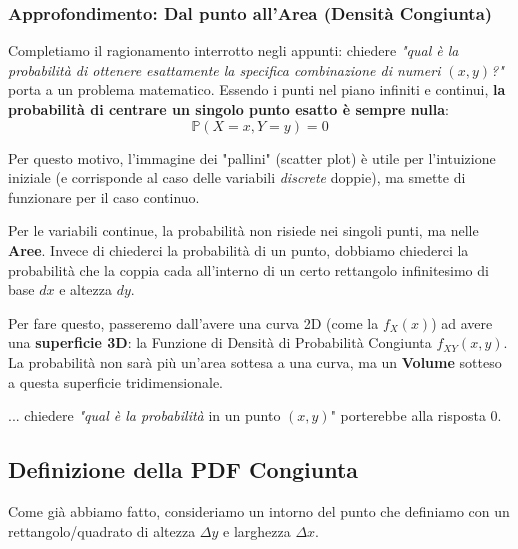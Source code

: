 \subsubsection*{Approfondimento: Dal punto all'Area (Densità Congiunta)}

Completiamo il ragionamento interrotto negli appunti: chiedere \textit{"qual è la probabilità di ottenere esattamente la specifica combinazione di numeri $(x,y)$?"} porta a un problema matematico. Essendo i punti nel piano infiniti e continui, \textbf{la probabilità di centrare un singolo punto esatto è sempre nulla}:
\begin{equation}
\mathbb{P}(X=x, Y=y) = 0
\end{equation}

Per questo motivo, l'immagine dei "pallini" (scatter plot) è utile per l'intuizione iniziale (e corrisponde al caso delle variabili \textit{discrete} doppie), ma smette di funzionare per il caso continuo. 

Per le variabili continue, la probabilità non risiede nei singoli punti, ma nelle \textbf{Aree}. 
Invece di chiederci la probabilità di un punto, dobbiamo chiederci la probabilità che la coppia cada all'interno di un certo rettangolo infinitesimo di base $dx$ e altezza $dy$. 

Per fare questo, passeremo dall'avere una curva 2D (come la $f_X(x)$) ad avere una \textbf{superficie 3D}: la Funzione di Densità di Probabilità Congiunta $f_{XY}(x,y)$. La probabilità non sarà più un'area sottesa a una curva, ma un \textbf{Volume} sotteso a questa superficie tridimensionale.

... chiedere \textit{"qual è la probabilità} in un punto $(x,y)$" porterebbe alla risposta 0.

\subsection{Definizione della PDF Congiunta}

Come già abbiamo fatto, consideriamo un intorno del punto che definiamo con un rettangolo/quadrato di altezza $\Delta y$ e larghezza $\Delta x$.

